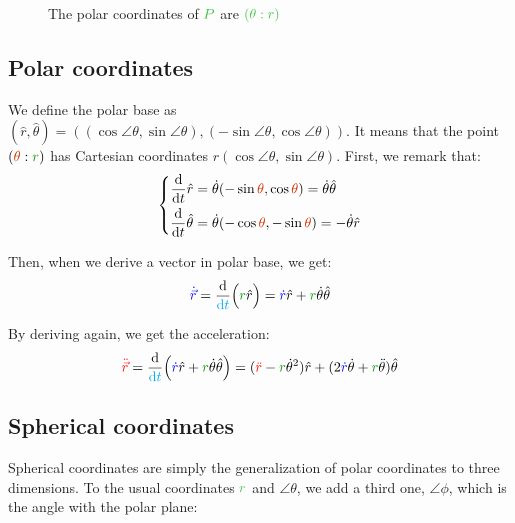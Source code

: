 \begin{figure}[H]
\centering
{}
\caption{The polar coordinates of $\posit{P}$ are $\posit{(\theta:r)}$}
\end{figure}


\subsection{Polar coordinates}

We define the polar base as $(\hat r, \hat \theta) = ((\cos
\angle{\theta}, \sin \angle{\theta}), (-\sin \angle{\theta}, \cos
\angle{\theta}))$. It means that the point $(\angle{\theta}:\dist{r})$
has Cartesian coordinates $r(\cos \angle{\theta}, \sin
\angle{\theta})$. First, we remark that:
\[
\left\{
\begin{aligned}
\frac {\d} {\dt} \hat r      &= \dot \theta (- \sin \angle{\theta},   \cos \angle{\theta}) = \dot \theta \hat \theta \\
\frac {\d} {\dt} \hat \theta &= \dot \theta (- \cos \angle{\theta}, - \sin \angle{\theta}) = - \dot \theta \hat r \\
\end{aligned}
\right.
\]

Then, when we derive a vector in polar base, we get:
\[
\speed{\dot {\vec r}}
= \frac {\d} {\delay{\dt}} \Big(\dist{r} \hat r\Big)
= \speed{\dot r} \hat r + \dist{r} \dot \theta \hat \theta
\]

By deriving again, we get the acceleration:
\[
\accel{\ddot {\vec r}}
= \frac {\d} {\delay{\dt}} \Big(\speed{\dot r} \hat r + \dist{r} \dot \theta \hat \theta\Big)
= (\accel{\ddot r} - \dist{r} {\dot \theta}^2) \hat r
  + (2 \speed{\dot r} \dot \theta + \dist{r} \ddot \theta) \hat \theta
\]


\subsection{Spherical coordinates}

Spherical coordinates are simply the generalization of polar
coordinates to three dimensions. To the usual coordinates $\posit{r}$
and $\angle{\theta}$, we add a third one, $\angle{\phi}$, which is the
angle with the polar plane:

